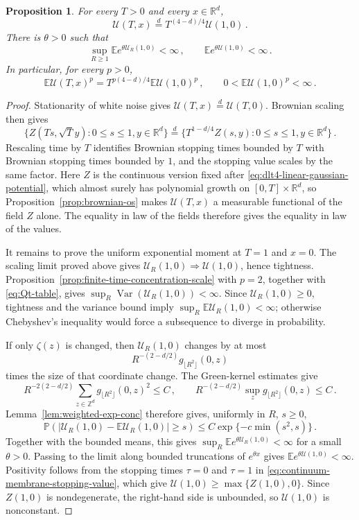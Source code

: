 \documentclass[11pt]{amsart}
\theoremstyle{plain}
\newtheorem{proposition}[theorem]{Proposition}
\theoremstyle{definition}
\newcommand{\Z}{\mathbb{Z}}
\newcommand{\R}{\mathbb{R}}
\newcommand{\E}{\mathbb{E}}
\renewcommand{\P}{\mathbb{P}}
\DeclareMathOperator{\Var}{Var}
\begin{document}
	\begin{proposition}\label{prop:continuum-value-selfsimilar}
		For every $T>0$ and every $x\in\R^d$,
		\[
			\mathcal U(T,x)\stackrel d= T^{(4-d)/4}\mathcal U(1,0)\, .
		\]
			There is $\theta>0$ such that
			\[
				\sup_{R\geq1}\E e^{\theta\mathcal U_R(1,0)}<\infty\, ,
				\qquad
				\E e^{\theta\mathcal U(1,0)}<\infty \, .
			\]
		In particular, for every $p>0$,
		\[
			\E\mathcal U(T,x)^p
			=
			T^{p(4-d)/4}\E\mathcal U(1,0)^p\, ,
			\qquad
			0<\E\mathcal U(1,0)^p<\infty \, .
		\]
	\end{proposition}
	\begin{proof}
		Stationarity of white noise gives
		$\mathcal U(T,x)\stackrel d=\mathcal U(T,0)$. Brownian scaling then gives
		\[
			\{Z(Ts,\sqrt T y):0\leq s\leq1,y\in\R^d\}
			\stackrel d=
			\{T^{1-d/4}Z(s,y):0\leq s\leq1,y\in\R^d\}\, .
		\]
		Rescaling time by $T$ identifies Brownian stopping
		times bounded by $T$ with Brownian stopping times bounded by $1$, and
		the stopping value scales by the same factor.
		Here $Z$ is the continuous version fixed after
		\eqref{eq:dlt4-linear-gaussian-potential}, which almost surely has
		polynomial growth on $[0,T]\times\R^d$, so
		Proposition~\ref{prop:brownian-os} makes $\mathcal U(T,x)$ a measurable
		functional of the field $Z$ alone. The equality in law of the fields
		therefore gives the equality in law of the values.

			It remains to prove the uniform exponential moment at $T=1$ and $x=0$. The
			scaling limit proved above gives
		$\mathcal U_R(1,0)\Longrightarrow\mathcal U(1,0)$, hence tightness.
		Proposition~\ref{prop:finite-time-concentration-scale} with
		$p=2$, together with \eqref{eq:Qt-table}, gives
		$\sup_R\Var(\mathcal U_R(1,0))<\infty$. Since $\mathcal U_R(1,0)\geq0$,
		tightness and the variance bound imply
		$\sup_R\E\mathcal U_R(1,0)<\infty$; otherwise Chebyshev's inequality
		would force a subsequence to diverge in probability.

		If only $\zeta(z)$ is changed, then $\mathcal U_R(1,0)$ changes by at most
		\[
			R^{-(2-d/2)}g_{\lfloor R^2\rfloor}(0,z)
		\]
		times the size of that coordinate change.
		The Green-kernel estimates give
		\[
			R^{-2(2-d/2)}\sum_{z\in\Z^d} g_{\lfloor R^2\rfloor}(0,z)^2\leq C\, ,
			\qquad
			R^{-(2-d/2)}\sup_z g_{\lfloor R^2\rfloor}(0,z)\leq C \, .
		\]
		Lemma~\ref{lem:weighted-exp-conc} therefore gives, uniformly in $R$, $s\geq0$,
		\[
			\P\left(
			|\mathcal U_R(1,0)-\E\mathcal U_R(1,0)|\geq s
			\right)
			\leq C\exp\{-c\min(s^2,s)\} \, .
		\]
		Together with the bounded means, this gives
		$\sup_R\E e^{\theta\mathcal U_R(1,0)}<\infty$ for a small
		$\theta>0$. Passing to the limit along bounded truncations of
		$e^{\theta x}$ gives $\E e^{\theta\mathcal U(1,0)}<\infty$.
		Positivity follows from the stopping times $\tau=0$ and $\tau=1$ in
		\eqref{eq:continuum-membrane-stopping-value}, which give $\mathcal U(1,0)\geq\max\{Z(1,0),0\}$.
		Since $Z(1,0)$ is nondegenerate, the right-hand side is unbounded, so $\mathcal U(1,0)$ is nonconstant.
	\end{proof}
\end{document}
